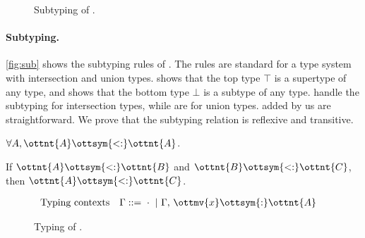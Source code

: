 \begin{figure}
\IUdefnsub{}
\caption{Subtyping of \lambdaiu.} \label{fig:sub}
\end{figure}

\paragraph{Subtyping.}
\autoref{fig:sub} shows the subtyping rules of \lambdaiu. The rules are standard
for a type system with intersection and union types.  shows that
the top type $ \top $ is a supertype of any type, and  shows that
the bottom type $ \bot $ is a subtype of any type.
 handle the subtyping for intersection types,
while  are for union types. 
added by us are straightforward. We prove that the subtyping relation is
reflexive and transitive.

\begin{theorem}
  $\forall A, \ottnt{A}  \ottsym{<:}  \ottnt{A}$.
\end{theorem}
\begin{theorem}
  If $\ottnt{A}  \ottsym{<:}  \ottnt{B}$ and $\ottnt{B}  \ottsym{<:}  \ottnt{C}$, then $\ottnt{A}  \ottsym{<:}  \ottnt{C}$.
\end{theorem}

\begin{figure}[t]
\begin{align*}
  &\text{Typing contexts}&\Gamma ::=&~  \cdot  ~|~ \Gamma  ,\,  \ottmv{x}  \ottsym{:}  \ottnt{A}
\end{align*}
\IUdefntyping{}
\caption{Typing of \lambdaiu.} \label{fig:typ}
\end{figure}

